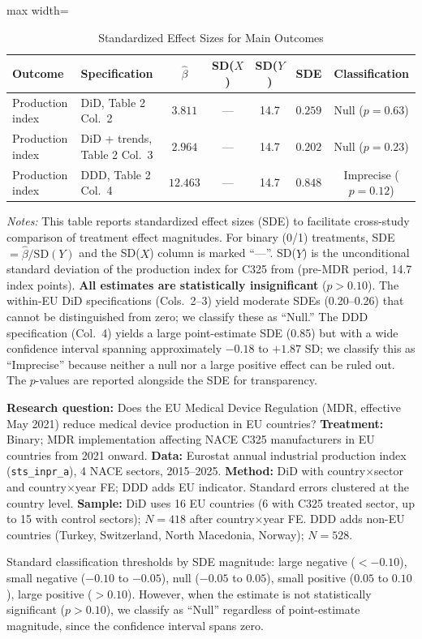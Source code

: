 \documentclass[12pt]{article}
\begin{document}
\begin{table}[H]
\centering
\caption{Standardized Effect Sizes for Main Outcomes}
\label{tab:sde}
\begin{adjustbox}{max width=\textwidth}
\begin{tabular}{llccccc}
\toprule
Outcome & Specification & $\hat{\beta}$ & SD($X$) & SD($Y$) & SDE & Classification \\
\midrule
Production index & DiD, Table 2 Col.\ 2 & $3.811$ & --- & 14.7 & $0.259$ & Null ($p = 0.63$) \\
Production index & DiD + trends, Table 2 Col.\ 3 & $2.964$ & --- & 14.7 & $0.202$ & Null ($p = 0.23$) \\
Production index & DDD, Table 2 Col.\ 4 & $12.463$ & --- & 14.7 & $0.848$ & Imprecise ($p = 0.12$) \\
\bottomrule
\end{tabular}
\end{adjustbox}
\par\vspace{0.3em}
{\footnotesize \emph{Notes:} This table reports standardized effect sizes (SDE)
to facilitate cross-study comparison of treatment effect magnitudes.
For binary (0/1) treatments, SDE $= \hat{\beta} / \text{SD}(Y)$ and the SD($X$)
column is marked ``---''.
SD($Y$) is the unconditional standard deviation of the production index for C325
from  (pre-MDR period, 14.7 index points).
\textbf{All estimates are statistically insignificant} ($p > 0.10$).
The within-EU DiD specifications (Cols.\ 2--3) yield moderate SDEs (0.20--0.26) that cannot be distinguished from zero; we classify these as ``Null.''
The DDD specification (Col.\ 4) yields a large point-estimate SDE (0.85) but with a wide confidence interval spanning approximately $-0.18$ to $+1.87$ SD; we classify this as ``Imprecise'' because neither a null nor a large positive effect can be ruled out. The $p$-values are reported alongside the SDE for transparency.

\textbf{Research question:} Does the EU Medical Device Regulation (MDR, effective May 2021) reduce medical device production in EU countries?
\textbf{Treatment:} Binary; MDR implementation affecting NACE C325 manufacturers in EU countries from 2021 onward.
\textbf{Data:} Eurostat annual industrial production index (\texttt{sts\_inpr\_a}), 4 NACE sectors, 2015--2025.
\textbf{Method:} DiD with country$\times$sector and country$\times$year FE; DDD adds EU indicator. Standard errors clustered at the country level.
\textbf{Sample:} DiD uses 16 EU countries (6 with C325 treated sector, up to 15 with control sectors); $N = 418$ after country$\times$year FE. DDD adds non-EU countries (Turkey, Switzerland, North Macedonia, Norway); $N = 528$.

Standard classification thresholds by SDE magnitude:
large negative ($< -0.10$), small negative ($-0.10$ to $-0.05$),
null ($-0.05$ to $0.05$), small positive ($0.05$ to $0.10$),
large positive ($> 0.10$). However, when the estimate is not statistically
significant ($p > 0.10$), we classify as ``Null'' regardless of point-estimate
magnitude, since the confidence interval spans zero.}
\end{table}
\end{document}
